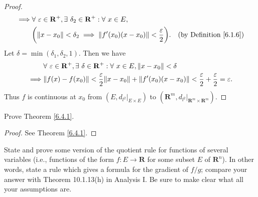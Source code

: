 \begin{proof}
\begin{align*}
        \implies & \forall\ \varepsilon \in \mathbf{R}^+, \exists\ \delta_2 \in \mathbf{R}^+ : \forall\ x \in E,                                                  \\
                 & \bigg(\norm*{x - x_0} < \delta_2 \implies \norm*{f'(x_0)(x - x_0)} < \frac{\varepsilon}{2}\bigg).         & \text{(by Definition \ref{6.1.6})}
    \end{align*}
    Let \(\delta = \min(\delta_1, \delta_2, 1)\).
    Then we have
    \begin{align*}
                 & \forall\ \varepsilon \in \mathbf{R}^+, \exists\ \delta \in \mathbf{R}^+ : \forall\ x \in E, \norm*{x - x_0} < \delta                                    \\
        \implies & \norm*{f(x) - f(x_0)} < \frac{\varepsilon}{2} \norm*{x - x_0} + \norm*{f'(x_0)(x - x_0)} < \frac{\varepsilon}{2} + \frac{\varepsilon}{2} = \varepsilon.
    \end{align*}
    Thus \(f\) is continuous at \(x_0\) from \((E, d_{l^2}|_{E \times E})\) to \((\mathbf{R}^m, d_{l^2}|_{\mathbf{R}^m \times \mathbf{R}^m})\).
\end{proof}

\begin{exercise}\label{ex 6.4.3}
    Prove Theorem \ref{6.4.1}.
\end{exercise}

\begin{proof}
    See Theorem \ref{6.4.1}.
\end{proof}

\begin{exercise}\label{ex 6.4.4}
    State and prove some version of the quotient rule for functions of several variables (i.e., functions of the form \(f : E \to \mathbf{R}\) for some subset \(E\) of \(\mathbf{R}^n\)).
    In other words, state a rule which gives a formula for the gradient of \(f / g\);
    compare your answer with Theorem 10.1.13(h) in Analysis I.
    Be sure to make clear what all your assumptions are.
\end{exercise}

